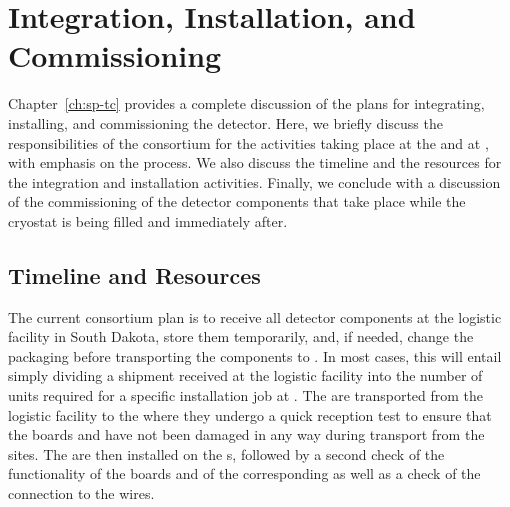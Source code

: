 \section{Integration, Installation, and Commissioning}
\label{sec:fdsp-tpcelec-integration}


Chapter~\ref{ch:sp-tc} provides a complete discussion of the plans for 
integrating, installing, and commissioning the detector.
Here, we briefly discuss the responsibilities of the 
consortium for the activities taking place at the
 and at , with emphasis on
the  process. We also discuss the timeline
and the resources for the integration and installation activities.
Finally, we conclude with a discussion of the commissioning
of the  detector components that take place while
the cryostat is being filled and immediately after. 

\subsection{Timeline and Resources}
\label{sec:fdsp-tpcelec-integration-timeline}

The current  consortium plan is to receive all detector 
components at the logistic facility in South Dakota, store them temporarily, 
and, if needed, change the packaging before transporting the components to 
. In most cases, this will entail simply dividing a shipment 
received at the logistic facility into the number of units required for a 
specific installation job at . The  are transported 
from the logistic facility to the  where they undergo
a quick reception test to ensure that the boards and  
have not been damaged in any way during transport from the  
 sites. The  are then installed on the s,
followed by a second check of the functionality of 
the boards and of the corresponding  as well as a check of 
the connection to the  wires. 

